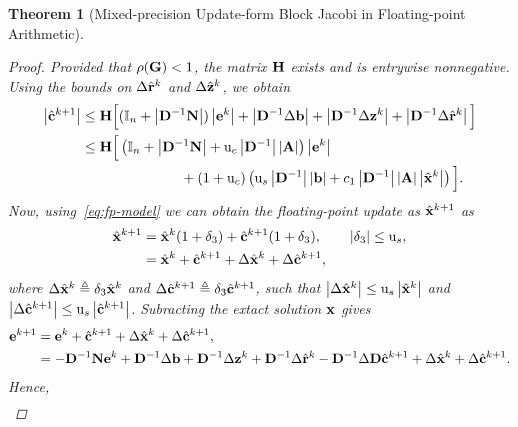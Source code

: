 \documentclass[11pt,draft]{article}
\newcommand{\urd}{\ensuremath{\mathrm{u}}}
\newcommand{\define}{\ensuremath{\triangleq}}
\newcommand{\vect}[1]{\mathbf{\MakeLowercase{#1}}}
\newcommand{\mat}[1]{\mathbf{\MakeUppercase{#1}}}
\newtheorem{theorem}{Theorem}[section]
\theoremstyle{definition}
\theoremstyle{remark}
\newcommand{\abs}[1]{\left|#1\right|}
\begin{document}
\begin{theorem}[Mixed-precision Update-form Block Jacobi in Floating-point Arithmetic]
\begin{proof}
    Provided that $\rho(\mat{g})<1$, the matrix $\mat{h}$ exists and is entrywise nonnegative.
    Using the bounds on $\Delta\hat{\vect{r}}^k$ and $\Delta \hat{\vect{z}}^k$, we obtain
\begin{align}
    \abs{\hat{\vect{c}}^{k+1}}
    &\leq
    \mat{h}
    \Big[
        (\mathbb{I}_n+\abs{\mat{d}^{-1}\mat{n}})
        \abs{\vect{e}^k}
        +\abs{\mat{d}^{-1}\Delta\vect{b}}
        +\abs{\mat{d}^{-1}\Delta\vect{z}^k}
        +\abs{\mat{d}^{-1}\Delta\hat{\vect{r}}^k}
    \Big]
    \\
    &\leq
    \mat{h}
    \Big[
        \left(
            \mathbb{I}_n
            +\abs{\mat{d}^{-1}\mat{n}}
            +\urd_c\abs{\mat{d}^{-1}}\abs{\mat{a}}
        \right)
        \abs{\vect{e}^k}
        \nonumber\\
    &\hspace{2.5cm}
        +(1+\urd_c)
        \left(
            \urd_s\abs{\mat{d}^{-1}}\abs{\vect{b}}
            +c_1\abs{\mat{d}^{-1}}\abs{\mat{a}}
             \abs{\hat{\vect{x}}^k}
        \right)
    \Big].
    \label{eq:correction_bound}
\end{align}
    Now, using~\cref{eq:fp-model} we can obtain the floating-point update as $\hat{\vect{x}}^{k+1}$ as
    \begin{align}
        \hat{\vect{x}}^{k+1} &= \hat{\vect{x}}^{k} ( 1 + \delta_3) + \hat{\vect{c}}^{k+1}(1 + \delta_3), \qquad \abs{\delta_3} \leq \urd_s,\\
         &= \hat{\vect{x}}^{k} + \hat{\vect{c}}^{k+1} +\Delta \hat{\vect{x}}^{k} + \Delta \hat{\vect{c}}^{k+1},
    \end{align}
    where $\Delta \hat{\vect{x}}^{k}\define \delta_3 \hat{\vect{x}}^{k}$ and $\Delta \hat{\vect{c}}^{k+1}\define \delta_3 \hat{\vect{c}}^{k+1}$, such that $\abs{\Delta \hat{\vect{x}}^{k}} \leq \urd_s \abs{\hat{\vect{x}}^{k}}$ and $\abs{\Delta \hat{\vect{c}}^{k+1}} \leq \urd_s \abs{ \hat{\vect{c}}^{k+1}}$.
    Subracting the extact solution $\vect{x}$ gives
    \begin{align}
        \vect{e}^{k+1} &= \vect{e}^{k} + \hat{\vect{c}}^{k+1} +\Delta \hat{\vect{x}}^{k} + \Delta \hat{\vect{c}}^{k+1},\\
        &=  -\mat{d}^{-1}\mat{n}\vect{e}^k + \mat{d}^{-1}\Delta \vect{b} + \mat{d}^{-1}\Delta \vect{z}^k + \mat{d}^{-1}\Delta \hat{\vect{r}}^k - \mat{d}^{-1}\Delta \mat{d} \hat{\vect{c}}^{k+1} + \Delta \hat{\vect{x}}^{k} + \Delta \hat{\vect{c}}^{k+1}.
    \end{align}
    Hence, 
\begin{align}

\end{align}
\end{proof}
\end{theorem}
\end{document}
